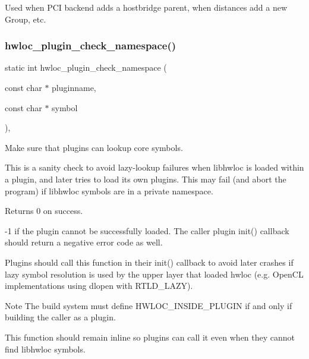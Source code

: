 Used when P\+CI backend adds a hostbridge parent, when distances add a new Group, etc. \mbox{\label{a00230_gac2eaed287bb215cf0bd33014e9e1d374}} 
\subsubsection{\texorpdfstring{hwloc\+\_\+plugin\+\_\+check\+\_\+namespace()}{hwloc\_plugin\_check\_namespace()}}
{\footnotesize\ttfamily static int hwloc\+\_\+plugin\+\_\+check\+\_\+namespace (\begin{DoxyParamCaption}\item[{const char $\ast$}]{pluginname,  }\item[{const char $\ast$}]{symbol }\end{DoxyParamCaption})\hspace{0.3cm}{\ttfamily [inline]}, {\ttfamily [static]}}



Make sure that plugins can lookup core symbols. 

This is a sanity check to avoid lazy-\/lookup failures when libhwloc is loaded within a plugin, and later tries to load its own plugins. This may fail (and abort the program) if libhwloc symbols are in a private namespace.

\begin{DoxyReturn}{Returns}
0 on success. 

-\/1 if the plugin cannot be successfully loaded. The caller plugin init() callback should return a negative error code as well.
\end{DoxyReturn}
Plugins should call this function in their init() callback to avoid later crashes if lazy symbol resolution is used by the upper layer that loaded hwloc (e.\+g. Open\+CL implementations using dlopen with R\+T\+L\+D\+\_\+\+L\+A\+ZY).

\begin{DoxyNote}{Note}
The build system must define H\+W\+L\+O\+C\+\_\+\+I\+N\+S\+I\+D\+E\+\_\+\+P\+L\+U\+G\+IN if and only if building the caller as a plugin.

This function should remain inline so plugins can call it even when they cannot find libhwloc symbols. 
\end{DoxyNote}
\mbox{\label{a00230_ga120d8bd74922e1030b621409a6b0be61}} 
